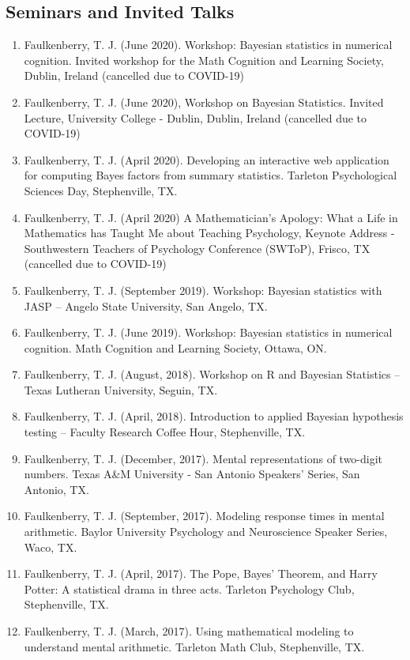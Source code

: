 \documentclass[article,10pt]{article}
\begin{document}
\subsection*{Seminars and Invited Talks}
\label{sec:org05dd513}
\begin{enumerate}
\item Faulkenberry, T. J. (June 2020). Workshop: Bayesian statistics in numerical cognition. Invited workshop for the Math Cognition and Learning Society, Dublin, Ireland (cancelled due to COVID-19)
\item Faulkenberry, T. J. (June 2020), Workshop on Bayesian Statistics. Invited Lecture, University College - Dublin, Dublin, Ireland (cancelled due to COVID-19)
\item Faulkenberry, T. J. (April 2020). Developing an interactive web application for computing Bayes factors from summary statistics. Tarleton Psychological Sciences Day, Stephenville, TX.
\item Faulkenberry, T. J. (April 2020) A Mathematician's Apology: What a Life in Mathematics has Taught Me about Teaching Psychology,  Keynote Address - Southwestern Teachers of Psychology Conference (SWToP), Frisco, TX (cancelled due to COVID-19)
\item Faulkenberry, T. J. (September 2019). Workshop: Bayesian statistics with JASP -- Angelo State University, San Angelo, TX.
\item Faulkenberry, T. J. (June 2019). Workshop: Bayesian statistics in numerical cognition. Math Cognition and Learning Society, Ottawa, ON.
\item Faulkenberry, T. J. (August, 2018). Workshop on R and Bayesian Statistics -- Texas Lutheran University, Seguin, TX.
\item Faulkenberry, T. J. (April, 2018). Introduction to applied Bayesian hypothesis testing -- Faculty Research Coffee Hour, Stephenville, TX.
\item Faulkenberry, T. J. (December, 2017). Mental representations of two-digit numbers. Texas A\&M University - San Antonio Speakers' Series, San Antonio, TX.
\item Faulkenberry, T. J. (September, 2017). Modeling response times in mental arithmetic. Baylor University Psychology and Neuroscience Speaker Series, Waco, TX.
\item Faulkenberry, T. J. (April, 2017). The Pope, Bayes' Theorem, and Harry Potter: A statistical drama in three acts.  Tarleton Psychology Club, Stephenville, TX.
\item Faulkenberry, T. J. (March, 2017). Using mathematical modeling to understand mental arithmetic. Tarleton Math Club, Stephenville, TX.

\end{enumerate}
\end{document}
